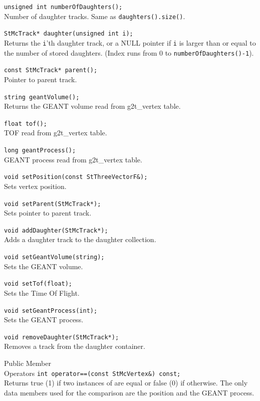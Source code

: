 \begin{Entry}
    \verb+unsigned int numberOfDaughters();+\\
    Number of daughter tracks. Same as {\tt daughters().size()}.

    \verb+StMcTrack* daughter(unsigned int i);+\\
    Returns the {\tt i}'th daughter track, or a NULL pointer
    if {\tt i} is larger than or equal to the number of stored daughters.
    (Index runs from 0 to {\tt numberOfDaughters()-1}).

    \verb+const StMcTrack* parent();+\\
    Pointer to parent track.
    
    \verb+string geantVolume();+\\
    Returns the GEANT volume read from g2t\_vertex table.

    \verb+float tof();+\\
    TOF read from g2t\_vertex table.

    \verb+long geantProcess();+\\
    GEANT process read from g2t\_vertex table.

    \verb+void setPosition(const StThreeVectorF&);+\\
    Sets vertex position.

    \verb+void setParent(StMcTrack*);+\\
    Sets pointer to parent track.

    \verb+void addDaughter(StMcTrack*); +\\
    Adds a daughter track to the daughter collection.

    \verb+void setGeantVolume(string); +\\
    Sets the GEANT volume.

    \verb+void setTof(float); +\\
    Sets the Time Of Flight.

    \verb+void setGeantProcess(int); +\\
    Sets the GEANT process.

    \verb+void removeDaughter(StMcTrack*);+\\
    Removes a track from the daughter container.

\item[Public Member\\ Operators]
    \verb+int operator==(const StMcVertex&) const;+\\
    Returns true (1) if two instances of  are equal or false (0)
    if otherwise.
    The only data members used for the comparison are the position and the
    GEANT process.


\end{Entry}
